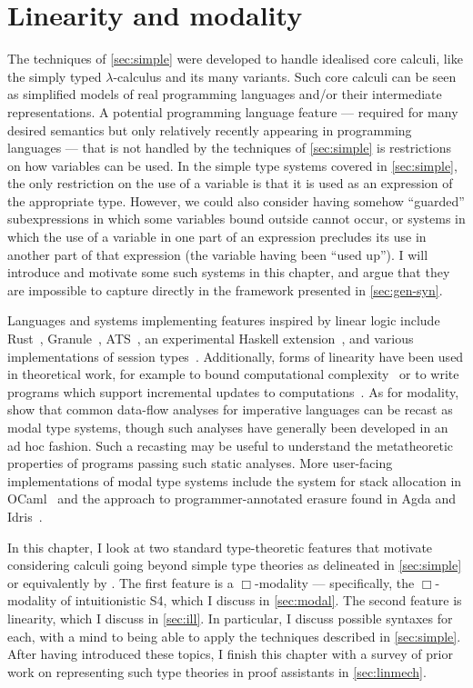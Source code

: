 \chapter{Linearity and modality}\label{sec:linearity}

The techniques of \cref{sec:simple} were developed to handle idealised core
calculi, like the simply typed $\lambda$-calculus and its many variants.
Such core calculi can be seen as simplified models of real programming languages
and/or their intermediate representations.
A potential programming language feature --- required for many desired semantics
but only relatively recently appearing in programming languages --- that is not
handled by the techniques of \cref{sec:simple} is restrictions on how variables
can be used.
In the simple type systems covered in \cref{sec:simple}, the only restriction on
the use of a variable is that it is used as an expression of the appropriate
type.
However, we could also consider having somehow ``guarded'' subexpressions in
which some variables bound outside cannot occur, or systems in which the use of
a variable in one part of an expression precludes its use in another part of
that expression (the variable having been ``used up'').
I will introduce and motivate some such systems in this chapter, and argue that
they are impossible to capture directly in the framework presented in
\cref{sec:gen-syn}.

Languages and systems implementing features inspired by linear logic include
Rust~\citep{MK14,Rust}, Granule~\citep{Granule18}, ATS~\citep{Xi04,ZX05}, an
experimental Haskell extension~\citep{BBNPS17}, and various implementations of
session types~\citep{HLVCCDMPRTVTZ16}.
Additionally, forms of linearity have been used in theoretical work, for example
to bound computational complexity~\citep{GSS92,Hofmann03} or to write programs
which support incremental updates to computations~\citep{ER03,Ehrhard18}.
As for modality, \citet{IMO20} show that common data-flow analyses for
imperative languages can be recast as modal type systems, though such analyses
have generally been developed in an ad hoc fashion.
Such a recasting may be useful to understand the metatheoretic properties of
programs passing such static analyses.
More user-facing implementations of modal type systems include the system for
stack allocation in OCaml~\citep{DW22} and the approach to programmer-annotated
erasure found in Agda and Idris~\citep{Atkey18,Brady21}.

In this chapter, I look at two standard type-theoretic features that motivate
considering calculi going beyond simple type theories as delineated in
\cref{sec:simple} or equivalently by \citet{AACMM21}.
The first feature is a $\Box$-modality --- specifically, the $\Box$-modality of
intuitionistic S4, which I discuss in \cref{sec:modal}.
The second feature is linearity, which I discuss in \cref{sec:ill}.
In particular, I discuss possible syntaxes for each, with a mind to
being able to apply the techniques described in \cref{sec:simple}.
After having introduced these topics, I finish this chapter with a survey of
prior work on representing such type theories in proof assistants in
\cref{sec:linmech}.

